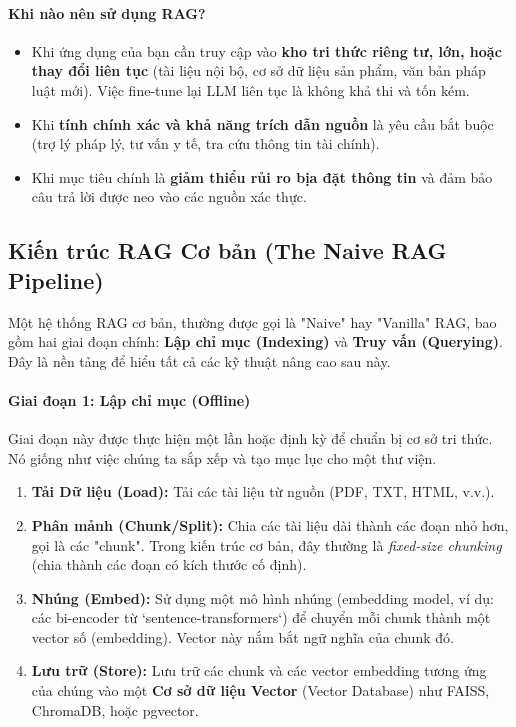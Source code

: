 \paragraph{Khi nào nên sử dụng RAG?}
\begin{itemize}
    \item Khi ứng dụng của bạn cần truy cập vào \textbf{kho tri thức riêng tư, lớn, hoặc thay đổi liên tục} (tài liệu nội bộ, cơ sở dữ liệu sản phẩm, văn bản pháp luật mới). Việc fine-tune lại LLM liên tục là không khả thi và tốn kém.
    \item Khi \textbf{tính chính xác và khả năng trích dẫn nguồn} là yêu cầu bắt buộc (trợ lý pháp lý, tư vấn y tế, tra cứu thông tin tài chính).
    \item Khi mục tiêu chính là \textbf{giảm thiểu rủi ro bịa đặt thông tin} và đảm bảo câu trả lời được neo vào các nguồn xác thực.
\end{itemize}

\subsection{Kiến trúc RAG Cơ bản (The Naive RAG Pipeline)}
\label{ssec:naive_rag}
Một hệ thống RAG cơ bản, thường được gọi là "Naive" hay "Vanilla" RAG, bao gồm hai giai đoạn chính: \textbf{Lập chỉ mục (Indexing)} và \textbf{Truy vấn (Querying)}. Đây là nền tảng để hiểu tất cả các kỹ thuật nâng cao sau này.

\paragraph{Giai đoạn 1: Lập chỉ mục (Offline)}
Giai đoạn này được thực hiện một lần hoặc định kỳ để chuẩn bị cơ sở tri thức. Nó giống như việc chúng ta sắp xếp và tạo mục lục cho một thư viện.
\begin{enumerate}
    \item \textbf{Tải Dữ liệu (Load):} Tải các tài liệu từ nguồn (PDF, TXT, HTML, v.v.).
    \item \textbf{Phân mảnh (Chunk/Split):} Chia các tài liệu dài thành các đoạn nhỏ hơn, gọi là các "chunk". Trong kiến trúc cơ bản, đây thường là \textit{fixed-size chunking} (chia thành các đoạn có kích thước cố định).
    \item \textbf{Nhúng (Embed):} Sử dụng một mô hình nhúng (embedding model, ví dụ: các bi-encoder từ `sentence-transformers`) để chuyển mỗi chunk thành một vector số (embedding). Vector này nắm bắt ngữ nghĩa của chunk đó.
    \item \textbf{Lưu trữ (Store):} Lưu trữ các chunk và các vector embedding tương ứng của chúng vào một \textbf{Cơ sở dữ liệu Vector} (Vector Database) như FAISS, ChromaDB, hoặc pgvector.
\end{enumerate}

